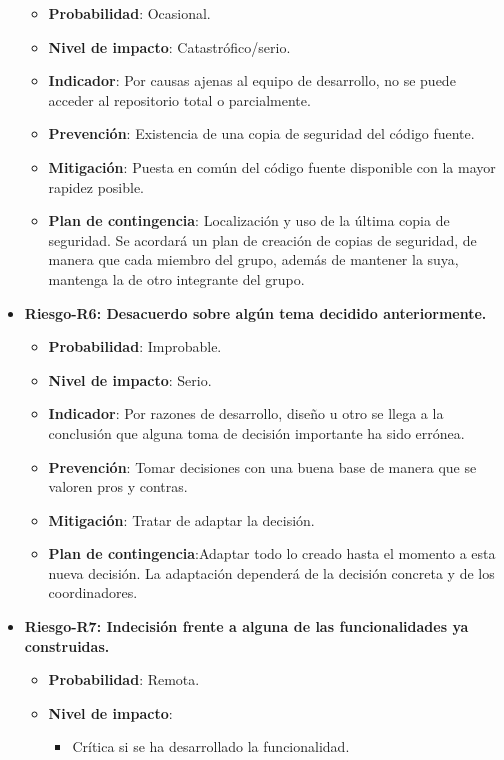 \begin{itemize}
		\begin{itemize}	
		\item{ \bf Probabilidad}: Ocasional.
		\item{ \bf Nivel de impacto}: Catastrófico/serio.
		\item{ \bf Indicador}: Por causas ajenas al equipo de desarrollo, no se puede acceder al repositorio total o parcialmente.
		\item{ \bf Prevención}: Existencia de una copia de seguridad del código fuente.
		\item{ \bf Mitigación}: Puesta en común del código fuente disponible con la mayor rapidez posible.
		\item{ \bf Plan de contingencia}: Localización y uso de la última copia de seguridad. Se acordará un plan de creación de copias de seguridad, de manera que cada miembro del grupo, además de mantener la suya, mantenga la de otro integrante del grupo.\\
		\end{itemize}
\item { \bf Riesgo-R6: Desacuerdo sobre algún tema decidido anteriormente.}
		\begin{itemize}	
		\item{ \bf Probabilidad}: Improbable.
		\item{ \bf Nivel de impacto}: Serio.
		\item{ \bf Indicador}: Por razones de desarrollo, diseño u otro se llega a la conclusión que alguna toma de decisión importante ha sido errónea.
		\item{ \bf Prevención}: Tomar decisiones con una buena base de manera que se valoren pros y contras.
		\item{ \bf Mitigación}: Tratar de adaptar la decisión.
		\item{ \bf Plan de contingencia}:Adaptar todo lo creado hasta el momento a esta nueva decisión. La adaptación dependerá de la decisión concreta y de los coordinadores.\\
		\end{itemize}
\item { \bf Riesgo-R7: Indecisión frente a alguna de las funcionalidades ya construidas.}
		\begin{itemize}	
		\item{ \bf Probabilidad}: Remota.
		\item{ \bf Nivel de impacto}:
			\begin{itemize}
			\item Crítica si se ha desarrollado la funcionalidad.

\end{itemize}
\end{itemize}
\end{itemize}
